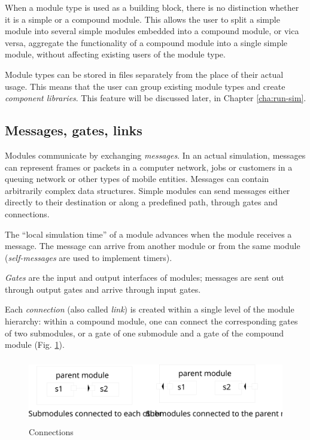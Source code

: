 When a module type is used as a building block, there is no
distinction whether it is a simple or a compound module. This allows
the user to split a simple module into several
simple modules embedded into a compound module,
or vica versa, aggregate the functionality of a compound module into a
single simple module, without affecting existing users of the module
type.

Module types can be stored in files separately from the place
of their actual usage. This means that the user can group existing
module types and create \textit{component libraries}. This feature
will be discussed later, in Chapter \ref{cha:run-sim}.



\subsection{Messages, gates, links}

Modules communicate by exchanging
\textit{messages}. In an actual simulation,
messages can represent frames or packets in a computer network, jobs
or customers in a queuing network or other types of mobile entities.
Messages can contain arbitrarily complex data structures. Simple
modules can send messages either directly to their destination or
along a predefined path, through gates and connections.


The ``local simulation time'' of a module advances when the module
receives a message. The message can arrive from another module
or from the same module (\textit{self-messages} are used to implement
timers).


\textit{Gates} are the input and output interfaces of
modules; messages are sent out through output gates and arrive through
input gates.

Each \textit{connection} (also called
\textit{link}) is created within a single level of the
module hierarchy: within a compound module, one can connect the
corresponding gates of two submodules, or a gate of one submodule and
a gate of the compound module (Fig.
\ref{fig:ch-overview:connections}).

\begin{figure}[htbp]
\begin{center}
\includegraphics[width=5.061in, height=1.121in]{figures/connections}
\caption{Connections}
\label{fig:ch-overview:connections}
\end{center}
\end{figure}


